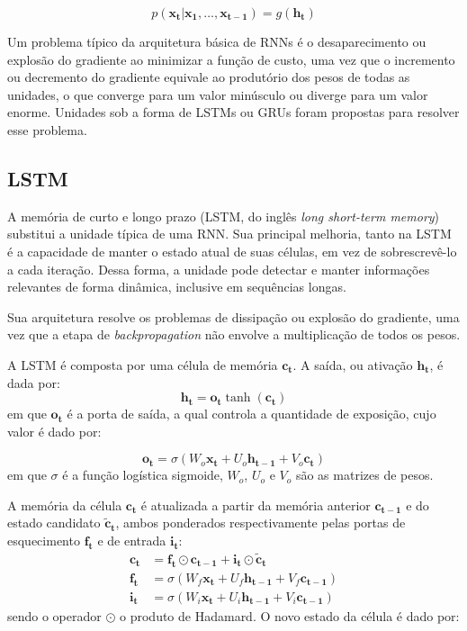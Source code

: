 \begin{equation}
    p(\mathbf{x_t}|\mathbf{x_1},\ldots , \mathbf{x_{t-1}}) = g(\mathbf{h_t})
\end{equation}

Um problema típico da arquitetura básica de RNNs é o desaparecimento ou explosão
do gradiente ao minimizar a função de custo, uma vez que o incremento ou
decremento do gradiente equivale ao produtório dos pesos de todas as unidades, o
que converge para um valor minúsculo ou diverge para um valor enorme. Unidades
sob a forma de LSTMs ou GRUs foram propostas para resolver esse problema.


\subsection{LSTM}
A memória de curto e longo prazo (LSTM, do inglês \textit{long short-term
memory}) \cite{chung2014empirical} substitui a unidade típica de uma RNN. Sua
principal melhoria, tanto na LSTM é a capacidade de manter o estado atual
de suas células, em vez de sobrescrevê-lo a cada iteração. Dessa forma, a
unidade pode detectar e manter informações relevantes de forma dinâmica,
inclusive em sequências longas.

Sua arquitetura resolve os problemas de dissipação ou explosão do
gradiente, uma vez que a etapa de \textit{backpropagation} não envolve a
multiplicação de todos os pesos.

A LSTM é composta por uma célula de memória $\mathbf{c_t}$. A saída, ou ativação
$\mathbf{h_t}$, é dada por:
\begin{equation}
    \mathbf{h_t} = \mathbf{o_t}\tanh(\mathbf{c_t})
\end{equation}
em que $\mathbf{o_t}$ é a porta de saída, a qual controla a quantidade de
exposição, cujo valor é dado por:

\begin{equation}
    \mathbf{o_t} = \sigma(W_o\mathbf{x_t} + U_o\mathbf{h_{t-1}} + V_o\mathbf{c_t})
\end{equation}
em que $\sigma$ é a função logística sigmoide, $W_o$, $U_o$ e $V_o$ são as
matrizes de pesos.

A memória da célula $\mathbf{c_t}$ é atualizada a partir da memória anterior
$\mathbf{c_{t-1}}$ e do estado candidato $\mathbf{\tilde{c}_t}$, ambos ponderados
respectivamente pelas portas de esquecimento $\mathbf{f_t}$ e de entrada $\mathbf{i_t}$:
\begin{align}
    \mathbf{c_t} &= \mathbf{f_t} \odot \mathbf{c_{t-1}} + \mathbf{i_t} \odot \mathbf{\tilde{c}_t} \\
    \mathbf{f_t} &= \sigma(W_f\mathbf{x_t} + U_f\mathbf{h_{t-1}} + V_f\mathbf{c_{t-1}}) \\
    \mathbf{i_t} &= \sigma(W_i\mathbf{x_t} + U_i\mathbf{h_{t-1}} + V_i\mathbf{c_{t-1}})
\end{align}
sendo o operador $\odot$ o produto
de Hadamard. O novo estado da célula é dado por:

